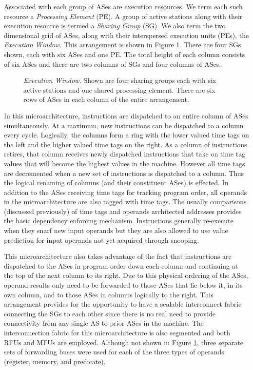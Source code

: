 \documentclass[10pt,dvips]{article}
\begin{document}
Associated with each group of ASes are execution resources.
We term each such resource
a \textit{Processing Element} (PE).  
A group of active stations along with their execution resource
is termed a \textit{Sharing Group} (SG).
We also term the two dimensional
grid of ASes, along with their interspersed execution units (PEs),
the {\em Execution Window}.
This arrangement is shown in Figure \ref{fig:window}.  
There are four SGs shown, each with six ASes and one PE.
The total height of each column consists of six ASes and there
are two columns of SGs and four columns of ASes.
%
\begin{figure}
\centering
{}
\caption{{\em Execution Window.} Shown are four sharing groups
each with six active stations and one shared processing element.
There are six rows of ASes in each column of the entire arrangement.}
\label{fig:window}
\end{figure}
%
In this microarchitecture, instructions are dispatched to an entire
column of ASes simultaneously.
At a maximum, new instructions can be dispatched to a column every
cycle.  
Logically, the columns form a ring with the lower valued
time tags on the left and the higher valued time tags on
the right.  
As a column of instructions retires, that column 
receives
newly dispatched instructions that take on time tag values
that will become the highest values in the machine.
However all time tags are decremented
when a new set of instructions is dispatched to a column.
Thus the logical renaming of columns (and their constituent ASes)
is effected.
In addition to the ASes receiving time tags for tracking program
order, all operands in the microarchitecture are also tagged
with time tags.  The usually comparisons (discussed previously)
of time tags and operands architected addresses provides
the basic dependency enforcing mechanism.
Instructions generally re-execute when they snarf new
input operands but they are also allowed to use value prediction
for input operands not yet acquired through snooping.

This microarchitecture also takes advantage of the fact that
instructions are dispatched to the ASes in program order down
each column and continuing at the top of the next column to its right.
Due to this physical ordering of the ASes, operand results
only need to be forwarded to those ASes that lie below it, in its
own column, and to those ASes in columns logically to the
right.  
This arrangement provides for the opportunity to have 
a scalable interconnect
fabric connecting the SGs to each other since
there is no real need to provide connectivity
from any single AS to prior ASes in the machine.
The interconnection fabric for this microarchitecture
is also segmented and both RFUs and MFUs are employed.
Although not shown in Figure \ref{fig:window},
three separate sets of forwarding buses were used for
each of the three types of operands (register, memory,
and predicate).
%
%
\end{document}
